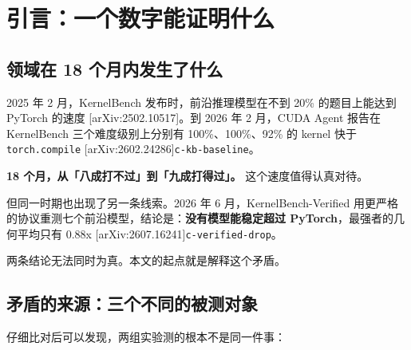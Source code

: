 \begin{abstract}
\textbf{第四，揭示了一个被整个领域回避的问题：这些 kernel 到底影响多少真实耗时。} 2026 年 9 月的实证研究给出答案：在 Transformer 推理中，\textbf{80\%-\hspace{0pt}86\% 的时间花在 cuBLAS GEMM 与 FlashAttention 上}，可优化空间只占 8.9\%-\hspace{0pt}58.2\%，端到端收益上限约 \textbf{1\%}。这意味着即使 kernel 快 2 倍，用户感受到的加速也可能不足 1\%。这是本文认为最需要被广泛知晓的一条{\scriptsize\texttt{c-\hspace{0pt}e2e-\hspace{0pt}fraction}}。


\textbf{关键词}：CUDA kernel；大语言模型；强化学习；智能体；基准评测；奖励黑客；端到端收益


\end{abstract}
\section{引言：一个数字能证明什么}

\subsection{领域在 18 个月内发生了什么}

2025 年 2 月，KernelBench 发布时，前沿推理模型在不到 20\% 的题目上能达到 PyTorch 的速度 [arXiv:2502.10517]。到 2026 年 2 月，CUDA Agent 报告在 KernelBench 三个难度级别上分别有 100\%、100\%、92\% 的 kernel 快于 \texttt{torch.compile} [arXiv:2602.24286]{\scriptsize\texttt{c-\hspace{0pt}kb-\hspace{0pt}baseline}}。


\textbf{18 个月，从「八成打不过」到「九成打得过」。} 这个速度值得认真对待。


但同一时期也出现了另一条线索。2026 年 6 月，KernelBench-Verified 用更严格的协议重测七个前沿模型，结论是：\textbf{没有模型能稳定超过 PyTorch}，最强者的几何平均只有 0.88x [arXiv:2607.16241]{\scriptsize\texttt{c-\hspace{0pt}verified-\hspace{0pt}drop}}。


两条结论无法同时为真。本文的起点就是解释这个矛盾。


\subsection{矛盾的来源：三个不同的被测对象}

仔细比对后可以发现，两组实验测的根本不是同一件事：


